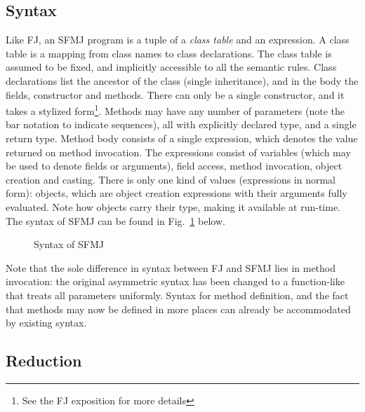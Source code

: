 \documentclass[11pt]{article}
\begin{document}
\subsection{Syntax}
\label{sec:syntax}

Like FJ, an SFMJ program is a tuple  of a \emph{class table} and an expression. A class table is a mapping from class names to class declarations. The class table is assumed to be fixed, and implicitly accessible to all the semantic rules. Class declarations list the ancestor of the class (single inheritance), and in the body the fields, constructor and methods. There can only be a single constructor, and it takes a stylized form\footnote{See the FJ exposition for more details}. Methods may have any number of parameters (note the bar notation to indicate sequences), all with explicitly declared type, and a single return type. Method body consists of a single expression, which denotes the value returned on method invocation. The expressions consist of variables (which may be used to denote fields or arguments), field access, method invocation, object creation and casting. There is only one kind of values (expressions in normal form): objects, which are object creation expressions with their arguments fully evaluated. Note how objects carry their type, making it available at run-time. The syntax of SFMJ can be found in Fig.~\ref{fig:syntax} below. 
\begin{figure}[h]
\caption{Syntax of SFMJ}
\label{fig:syntax}
\end{figure}



Note that the sole difference in syntax between FJ and SFMJ lies in method invocation: the original asymmetric syntax  has been changed to a function-like  that treats all parameters uniformly. Syntax for method definition, and the fact that methods may now be defined in more places can already be accommodated by existing syntax. 



\subsection{Reduction}
\label{sec:reduction}
\end{document}
